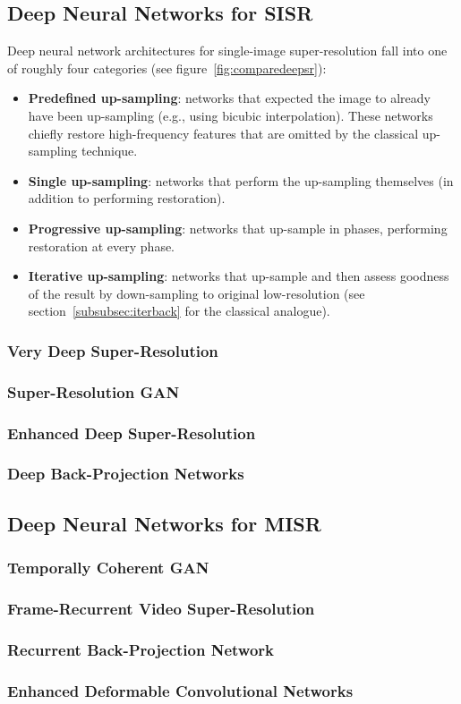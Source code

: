 \subsection{Deep Neural Networks for SISR}

Deep neural network architectures for single-image super-resolution fall into one of roughly four categories (see figure~\ref{fig:comparedeepsr}):
\begin{framed}
    \begin{itemize}
        \item \textbf{Predefined up-sampling}: networks that expected the image to already have been up-sampling (e.g., using bicubic interpolation). These networks chiefly restore high-frequency features that are omitted by the classical up-sampling technique.
        \item \textbf{Single up-sampling}: networks that perform the up-sampling themselves (in addition to performing restoration).
        \item \textbf{Progressive up-sampling}: networks that up-sample in phases, performing restoration at every phase.
        \item \textbf{Iterative up-sampling}: networks that up-sample and then assess goodness of the result by down-sampling to original low-resolution (see section~\ref{subsubsec:iterback} for the classical analogue).
    \end{itemize}
\end{framed}
\subsubsection{Very Deep Super-Resolution}\label{subsubsec:vdsr}
\subsubsection{Super-Resolution GAN}\label{subsubsec:srgan}
\subsubsection{Enhanced Deep Super-Resolution}\label{subsubsec:EDSR}
\subsubsection{Deep Back-Projection Networks}\label{subsubsec:dbpn}
\subsection{Deep Neural Networks for MISR}
\subsubsection{Temporally Coherent GAN}\label{subsubsec:tecogan}
\subsubsection{Frame-Recurrent Video Super-Resolution}\label{subsubsec:frvsr}
\subsubsection{Recurrent Back-Projection Network}\label{subsubsec:rbpn}
\subsubsection{Enhanced Deformable Convolutional Networks}\label{subsubsec:edvr}
